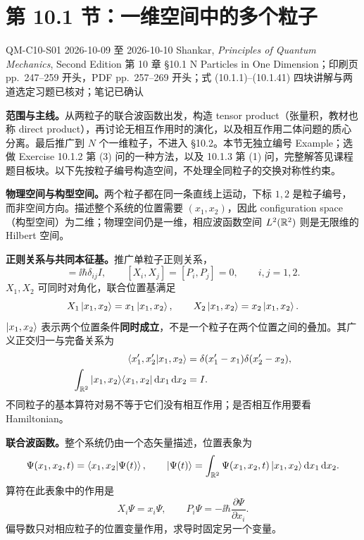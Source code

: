 \section{第 10.1 节：一维空间中的多个粒子}
\label{section:QM-C10-S01}
\studymeta
  {QM-C10-S01}
  {2026-10-09 至 2026-10-10}
  {Shankar, \textit{Principles of Quantum Mechanics}, Second Edition}
  {第 10 章 \S 10.1 N Particles in One Dimension；印刷页 pp.~247--259 开头，PDF pp.~257--269 开头；式 (10.1.1)--(10.1.41)}
  {四块讲解与两道选定习题已核对；笔记已确认}

\textbf{范围与主线。}从两粒子的联合波函数出发，构造 tensor product（张量积，教材也称 direct product），再讨论无相互作用时的演化，以及相互作用二体问题的质心分离。最后推广到 $N$ 个一维粒子，不进入 \S 10.2。本节无独立编号 Example；选做 Exercise 10.1.2 第 (3) 问的一种方法，以及 10.1.3 第 (1) 问，完整解答见课程题目板块。以下先按粒子编号构造空间，不处理全同粒子的交换对称性约束。

\textbf{物理空间与构型空间。}两个粒子都在同一条直线上运动，下标 $1,2$ 是粒子编号，而非空间方向。描述整个系统的位置需要 $(x_1,x_2)$，因此 configuration space（构型空间）为二维；物理空间仍是一维，相应波函数空间 $L^2(\mathbb{R}^2)$ 则是无限维的 Hilbert 空间。

\textbf{正则关系与共同本征基。}推广单粒子正则关系，
\begin{equation}
  [X_i,P_j]=\ii\hbar\delta_{ij}I,\qquad
  [X_i,X_j]=[P_i,P_j]=0,\qquad i,j=1,2.
\end{equation}
$X_1,X_2$ 可同时对角化，联合位置基满足
\begin{equation}
  X_1\left|x_1,x_2\right\rangle=x_1\left|x_1,x_2\right\rangle,\qquad
  X_2\left|x_1,x_2\right\rangle=x_2\left|x_1,x_2\right\rangle.
\end{equation}
$\left|x_1,x_2\right\rangle$ 表示两个位置条件\textbf{同时成立}，不是一个粒子在两个位置之间的叠加。其广义正交归一与完备关系为
\begin{align}
  \left\langle x_1',x_2' \middle| x_1,x_2 \right\rangle
    &=\delta(x_1'-x_1)\delta(x_2'-x_2),\\
  \int_{\mathbb{R}^2}\left|x_1,x_2\right\rangle\!\left\langle x_1,x_2\right|\mathop{}\!\mathrm{d} x_1\mathop{}\!\mathrm{d} x_2&=I.
\end{align}
不同粒子的基本算符对易不等于它们没有相互作用；是否相互作用要看 Hamiltonian。

\textbf{联合波函数。}整个系统仍由一个态矢量描述，位置表象为
\begin{equation}
  \Psi(x_1,x_2,t)=\left\langle x_1,x_2 \middle| \Psi(t) \right\rangle,\qquad
  \left|\Psi(t)\right\rangle=\int_{\mathbb{R}^2}\Psi(x_1,x_2,t)\left|x_1,x_2\right\rangle\mathop{}\!\mathrm{d} x_1\mathop{}\!\mathrm{d} x_2.
\end{equation}
算符在此表象中的作用是
\begin{equation}
  X_i\Psi=x_i\Psi,\qquad P_i\Psi=-\ii\hbar\frac{\partial\Psi}{\partial x_i}.
\end{equation}
偏导数只对相应粒子的位置变量作用，求导时固定另一个变量。

